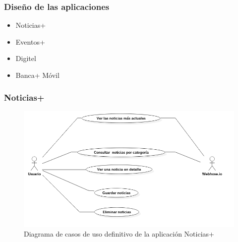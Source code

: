 \documentclass{beamer}
\begin{document}

\begin{frame}[fragile]
\frametitle{Diseño de las aplicaciones}
\begin{itemize}
	\item Noticias+
	\item Eventos+
	\item Digitel
	\item Banca+ Móvil
\end{itemize}

\end{frame}




\begin{frame}[fragile]
\frametitle{Noticias+}
\begin{figure}[H]
  \includegraphics[scale=0.3,type=png,ext=.png,read=.png,angle=0,origin=c]{../diagramas/CU/runrunes/runrunesCU}
  \caption*{Diagrama de casos de uso definitivo de la aplicación Noticias+}
\end{figure}

\end{frame}



\end{document}
